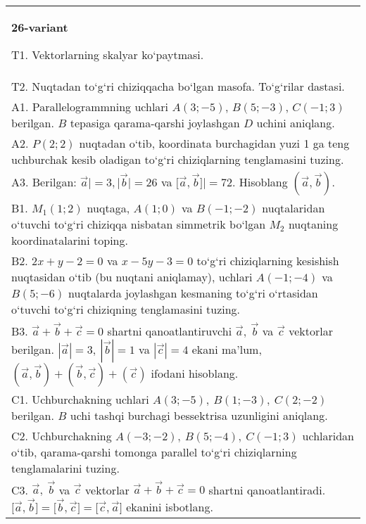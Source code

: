 \documentclass{article}
\begin{document}
\begin{tabular}{m{17cm}}
\textbf{26-variant}
\newline

T1. 
Vektorlarning skalyar ko‘paytmasi.
 \\
T2. 
Nuqtadan to‘g‘ri chiziqqacha bo‘lgan masofa. To‘g‘rilar dastasi.
 \\
A1. 
Parallelogrammning uchlari
$A (3;-5) $, $B (5;-3) $, $C (-1;3) $ berilgan. $B$ tepasiga
qarama-qarshi joylashgan $D$ uchini aniqlang.
 \\
A2. 
$P (2;2)$ nuqtadan o‘tib, koordinata burchagidan
yuzi 1 ga teng uchburchak kesib oladigan to‘g‘ri chiziqlarning
tenglamasini tuzing.
 \\
A3. 
Berilgan: $\overrightarrow{a}| = 3,|\overrightarrow{b}| = 26$ va
$\lbrack\overrightarrow{a},\overrightarrow{b}\rbrack| = 72$. Hisoblang
$\left(\overrightarrow{a},\overrightarrow{b} \right) $.
 \\
B1. 
\(M_{1} (1;2) \) nuqtaga, \(A (1;0) \) va \(B (-1;-2) \)
nuqtalaridan o‘tuvchi to‘g‘ri chiziqqa nisbatan simmetrik bo‘lgan \(M_{2}\) nuqtaning koordinatalarini toping.
 \\
B2. 
\(2x+y-2=0\) va \(x-5y-3=0\)
to‘g‘ri chiziqlarning kesishish nuqtasidan o‘tib (bu nuqtani aniqlamay), uchlari
\(A (-1;-4) \) va \(B (5;-6) \) nuqtalarda joylashgan kesmaning
to‘g‘ri o‘rtasidan o‘tuvchi to‘g‘ri chiziqning tenglamasini tuzing.
 \\
B3. 
$\vec{a} + \vec{b} + \vec{c} = 0$ shartni qanoatlantiruvchi $\vec{a},\ \vec{b}$ va $\vec{c}$ vektorlar berilgan. $|\vec{a}| = 3,\ |\vec{b}| = 1$ va $|\vec{c}| = 4$ ekani ma’lum, $\left(\vec{a},\vec{b} \right) + \left(\vec{b},\vec{c} \right) + (\vec{c}) $ ifodani hisoblang.
 \\
C1. 
Uchburchakning uchlari
\(A (3; - 5),\ B (1; - 3),\ C (2; - 2) \) berilgan. $B$ uchi tashqi
burchagi bessektrisa uzunligini aniqlang.
 \\
C2. 
Uchburchakning \(A (- 3; - 2),\ B (5; - 4),\ C (- 1;3) \)
uchlaridan o‘tib, qarama-qarshi tomonga parallel to‘g‘ri chiziqlarning tenglamalarini
tuzing.
 \\
C3. 
\(\vec{a},\ \vec{b}\) va \(\vec{c}\) vektorlar \(\vec{a} + \vec{b} + \vec{c} = 0\) shartni qanoatlantiradi. \(\lbrack\vec{a},\vec{b}\rbrack = \lbrack\vec{b},\vec{c}\rbrack = \lbrack\vec{c},\vec{a}\rbrack\) ekanini isbotlang.
 \\

\end{tabular}
\vspace{1cm}
\end{document}
